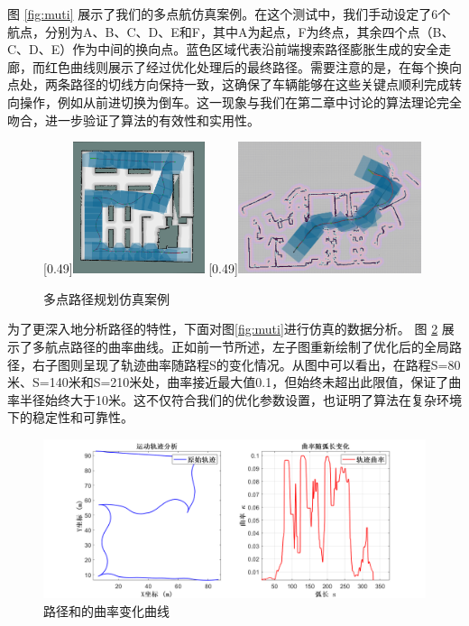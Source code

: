 \documentclass[master,academic]{ysuthesis} %
\begin{document}
		图 \ref{fig:muti} 展示了我们的多点航仿真案例。在这个测试中，我们手动设定了6个航点，分别为A、B、C、D、E和F，其中A为起点，F为终点，其余四个点（B、C、D、E）作为中间的换向点。蓝色区域代表沿前端搜索路径膨胀生成的安全走廊，而红色曲线则展示了经过优化处理后的最终路径。需要注意的是，在每个换向点处，两条路径的切线方向保持一致，这确保了车辆能够在这些关键点顺利完成转向操作，例如从前进切换为倒车。这一现象与我们在第二章中讨论的算法理论完全吻合，进一步验证了算法的有效性和实用性。
		
		\begin{figure}[!ht]
			\centering
			[0.49\textwidth]{\includegraphics[width=0.344\textwidth]{muti.png}}
			[0.49\textwidth]{\includegraphics[width=0.48\textwidth]{dataminco.png}}
			\caption{多点路径规划仿真案例}
			\label{fig:多点路径规划仿真案例}
			\end{figure}
		
		为了更深入地分析路径的特性，下面对图\ref{fig:muti}进行仿真的数据分析。 图 \ref{fig:datamuti} 展示了多航点路径的曲率曲线。正如前一节所述，左子图重新绘制了优化后的全局路径，右子图则呈现了轨迹曲率随路程S的变化情况。从图中可以看出，在路程S=80米、S=140米和S=210米处，曲率接近最大值0.1，但始终未超出此限值，保证了曲率半径始终大于10米。这不仅符合我们的优化参数设置，也证明了算法在复杂环境下的稳定性和可靠性。
		
		\begin{figure}[!ht]
		\centering
		\includegraphics[width=1\textwidth]{datamuti.png}
		\caption{路径和的曲率变化曲线}
		\label{fig:datamuti}
		\end{figure}
		
\end{document}
